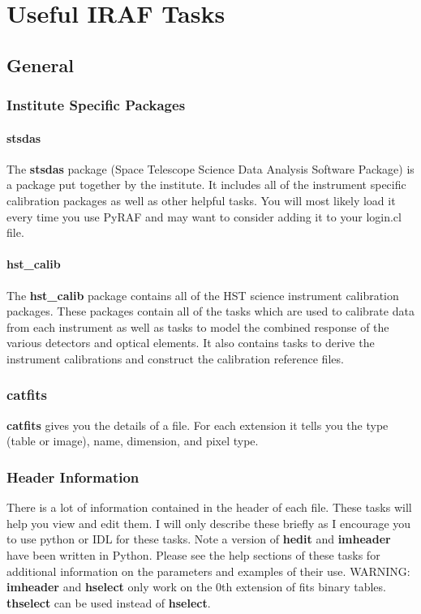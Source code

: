 \chapter{Useful IRAF Tasks }
\label{cha:chapter2}
\thispagestyle{empty}

 
\newpage
 
\section{General}
\subsection{Institute Specific Packages}
\subsubsection{{\bf stsdas}}
The {\bf stsdas} package (Space Telescope Science Data Analysis Software Package) is a package put together by the institute. It includes all of the instrument specific calibration packages as well as other helpful tasks. You will most likely load it every time you use PyRAF and may want to consider adding it to your login.cl file.

\subsubsection{{\bf hst\_calib}}
 The {\bf hst\_calib} package contains all of the HST science instrument calibration packages. These packages contain all of the tasks which are used to calibrate data from each instrument as well as tasks to model the combined response of the various detectors and optical elements. It also contains tasks to derive the instrument calibrations and construct the calibration reference files.

\subsection{{\bf catfits}}
{\bf catfits} gives you the details of a file. For each extension it tells you the type (table or image), name, dimension, and pixel type.


\subsection{Header Information}
There is a lot of information contained in the header of each file. These tasks will help you view and edit them. I will only describe these briefly as I encourage you to use python or IDL for these tasks. Note a version of {\bf hedit} and {\bf imheader} have been written in Python. Please see the help sections of these tasks for additional information on the parameters and examples of their use.
\newline
WARNING: {\bf imheader} and {\bf hselect} only work on the 0th extension of fits binary tables. {\bf thselect} can be used instead of {\bf hselect}.
